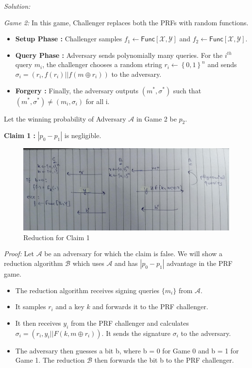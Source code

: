\documentclass[a4paper, 11pt]{article}
\newenvironment{solution}
    {\textit{Solution:}}
    {\clearpage}
\newcommand{\bit}{\left\{0, 1\right\}}
\newcommand{\func}{\mathsf{Func}}
\newcommand{\calA}{\mathcal{A}}
\newcommand{\calB}{\mathcal{B}}
\newcommand{\calX}{\mathcal{X}}
\newcommand{\calY}{\mathcal{Y}}
\begin{document}
\begin{solution}
\begin{enumerate}[(a)]
              \textit{Game 2:} In this game, Challenger replaces both the PRFs with random functions.
              \begin{itemize}
                  \item \textbf{Setup Phase :} Challenger samples $f_1 \leftarrow \func[\calX, \calY]$ and $f_2 \leftarrow \func[\calX, \calY]$.
                  \item \textbf{Query Phase :} Adversary sends polynomially many queries. For the $i^{th}$ query $m_i$, the challenger chooses a random string $r_i \leftarrow \bit^n$ and sends $\sigma_i = (r_i,f(r_i) || f(m \oplus r_i))$ to the adversary.
                  \item \textbf{Forgery :} Finally, the adversary outputs $(m^*, \sigma^*)$ such that $(m^*, \sigma^*) \neq (m_i, \sigma_i)$ for all i.
              \end{itemize}
              Let the winning probability of Adversary $\calA$ in Game 2 be $p_2$. 
              \vspace{20pt}

              \textbf{Claim 1 :} $|p_0 - p_1|$ is negligible.
              
              \begin{figure}[!ht]
                \centering
                \includegraphics[scale=0.25]{images/Claim1.jpg}
                \caption{Reduction for Claim 1}
                \label{fig:claim1}
              \end{figure}

              \textit{Proof:} Let $\calA$ be an adversary for which the claim is false. We will show a reduction algorithm $\calB$ which uses $\calA$ and has $|p_0 - p_1|$ advantage in the PRF game.

              \begin{itemize}
                \item The reduction algorithm receives signing queries $\{m_i\}$ from $\calA$. 
                \item It samples $r_i$ and a key $k$ and forwards it to the PRF challenger.
                \item It then receives $y_i$ from the PRF challenger and calculates $\sigma_i = (r_i, y_i || F(k, m \oplus r_i))$. It sends the signature $\sigma_i$ to the adversary.
                \item  The adversary then guesses a bit b, where b = 0 for Game 0 and b = 1 for Game 1. The reduction $\calB$ then forwards the bit b to the PRF challenger.
              \end{itemize}
                 


\end{enumerate}
\end{solution}
\end{document}
